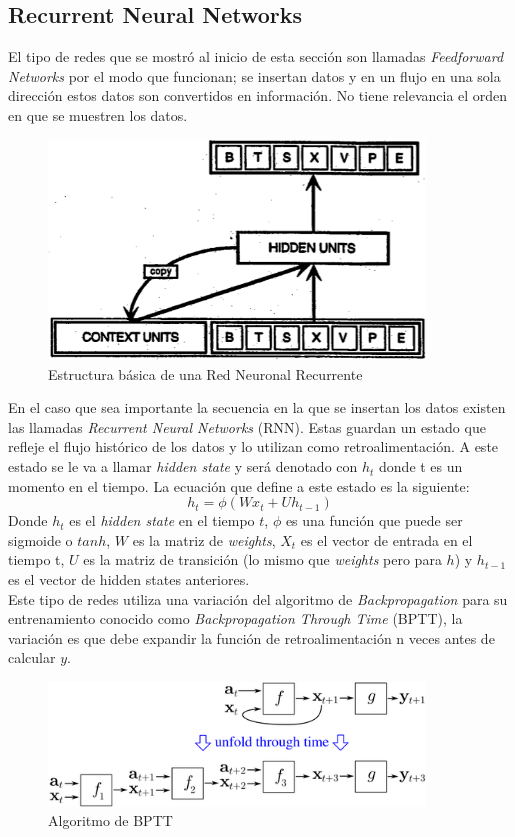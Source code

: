 \documentclass[12pt,spanish]{article}
\begin{document}
	\subsection{Recurrent Neural Networks}
	El tipo de redes que se mostró al inicio de esta sección son llamadas \textit{Feedforward Networks} por el modo que funcionan; se insertan datos y en un flujo en una sola dirección estos datos son convertidos en información. No tiene relevancia el orden en que se muestren los datos.\\
	\begin{figure}[H]
		\centering
		\includegraphics[width=10cm]{Imagenes/rnn_structure.png}
		\begin{centering}
			\caption{Estructura básica de una Red Neuronal Recurrente}
		\end{centering}
	\end{figure}
	En el caso que sea importante la secuencia en la que se insertan los datos existen las llamadas \textit{Recurrent Neural Networks} (RNN). Estas guardan un estado que refleje el flujo histórico de los datos y lo utilizan como retroalimentación. A este estado se le va a llamar \textit{hidden state} y será denotado con $h_t$ donde t es un momento en el tiempo. La ecuación que define a este estado es la siguiente:
	\[ h_t = \phi (Wx_t + Uh_{t-1}) \]
	Donde $h_t$ es el \textit{hidden state} en el tiempo $t$, $\phi$ es una función que puede ser sigmoide o $tanh$, $W$ es la matriz de \textit{weights}, $X_t$ es el vector de entrada en el tiempo t, $U$ es la matriz de transición (lo mismo que \textit{weights} pero para $h$) y $h_{t-1}$ es el vector de hidden states anteriores. \\
	Este tipo de redes utiliza una variación del algoritmo de \textit{Backpropagation} para su entrenamiento conocido como \textit{Backpropagation Through Time} (BPTT), la variación es que debe expandir la función de retroalimentación n veces antes de calcular $y$.
	\begin{figure}[H]
		\centering
		\includegraphics[width=10cm]{Imagenes/bptt.png}
		\begin{centering}
			\caption{Algoritmo de BPTT}
		\end{centering}
	\end{figure}
\end{document}
